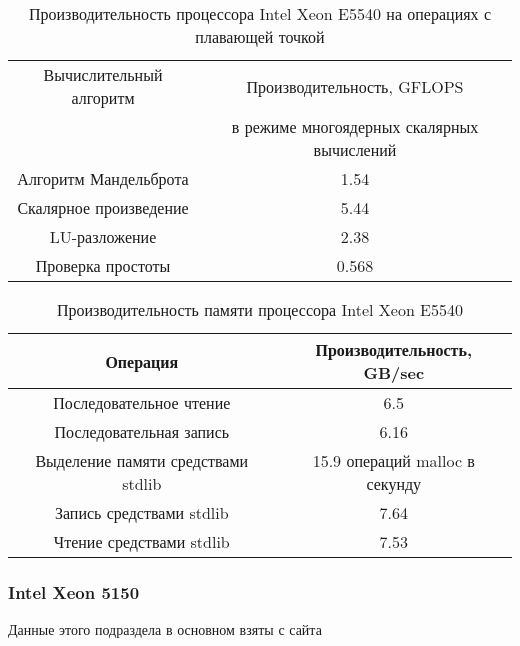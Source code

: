 \begin{table}[ht]
\begin{center}
\caption{Производительность процессора Intel Xeon  E5540 на операциях с плавающей точкой}
\begin{tabular}{|c|c|}
\hline	
Вычислительный алгоритм &  Производительность, GFLOPS \\ 
                 & в режиме многоядерных скалярных вычислений \\ \hline
Алгоритм Мандельброта  &  1.54 	\\ \hline
Скалярное произведение &  5.44   \\ \hline
LU-разложение          &  2.38   \\ \hline
Проверка простоты      & 0.568  \\ \hline 


		\end{tabular}
	\end{center} 	
\end{table} 	

\begin{table}[ht]
	\begin{center}
		\caption{Производительность памяти процессора Intel Xeon  E5540}
		\begin{tabular}{|c|c|}
			\hline	
			Операция  &  Производительность, GB/sec \\ \hline
			Последовательное чтение &  6.5 	\\  \hline
			Последовательная запись &  6.16   \\  \hline
			Выделение памяти средствами stdlib &  15.9 операций malloc в секунду  \\  \hline
			Запись средствами stdlib  & 7.64  \\ \hline
			Чтение средствами stdlib  & 7.53  \\ \hline 
		\end{tabular}
	\end{center} 	
\end{table} 	


\subsubsection{Intel Xeon 5150}

Данные этого подраздела в основном взяты с сайта \cite{geek_5150}


